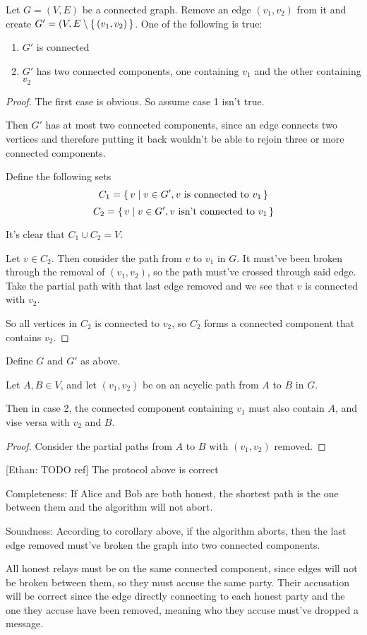 \documentclass{article}
\newcommand{\Ethan}[1]{{\footnotesize\color{magenta}[Ethan: #1]}}
\begin{document}
\begin{thm}
	Let $G=(V,E)$ be a connected graph. Remove an edge $(v_1, v_2)$ from it and create $G'=(V,E\setminus\set{(v_1, v_2)}$. One of the following is true:
	\begin{enumerate}
	\item $G'$ is connected
	\item $G'$ has two connected components, one containing $v_1$ and the other containing $v_2$
	\end{enumerate}
\end{thm}
\begin{proof}
The first case is obvious. So assume case 1 isn't true.

Then $G'$ has at most two connected components, since an edge connects two vertices and therefore putting it back wouldn't be able to rejoin three or more connected components.

Define the following sets
$$C_1=\set{v|v\in G', v \textnormal{ is connected to } v_1}$$
$$C_2=\set{v|v\in G', v \textnormal{ isn't connected to } v_1}$$

It's clear that $C_1\cup C_2=V$.

Let $v\in C_2$. Then consider the path from $v$ to $v_1$ in $G$. It must've been broken through the removal of $(v_1, v_2)$, so the path must've crossed through said edge.
Take the partial path with that last edge removed and we see that $v$ is connected with $v_2$.

So all vertices in $C_2$ is connected to $v_2$, so $C_2$ forms a connected component that contains $v_2$.
\end{proof}
\begin{cor}
Define $G$ and $G'$ as above.

Let $A, B\in V$, and let $(v_1, v_2)$ be on an acyclic path from $A$ to $B$ in $G$.

Then in case 2, the connected component containing $v_1$ must also contain $A$, and vise versa with $v_2$ and $B$.
\end{cor}
\begin{proof}
Consider the partial paths from $A$ to $B$ with $(v_1, v_2)$ removed.
\end{proof}

\begin{thm}
\Ethan{TODO ref} The protocol above is correct

Completeness: If Alice and Bob are both honest, the shortest path is the one between them and the algorithm will not abort.

Soundness:
According to corollary above, if the algorithm aborts, then the last edge removed must've broken the graph into two connected components.

All honest relays must be on the same connected component, since edges will not be broken between them, so they must accuse the same party.
Their accusation will be correct since the edge directly connecting to each honest party and the one they accuse have been removed, meaning who they accuse must've dropped a message.

\end{thm}
\end{document}

